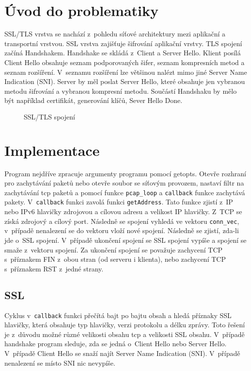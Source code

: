 \documentclass[a4paper, 12pt, titlepage]{article}
\begin{document}

\tableofcontents
\newpage

\section{Úvod do problematiky}
SSL/TLS vrstva se nachází z~pohledu síťové architektury mezi aplikační a transportní vrstvou. SSL vrstva zajišťuje šifrování aplikační vrstvy. TLS spojení začíná Handshakem. Handshake se skládá z~Client a Server Hello. Klient posílá Client Hello obsahuje seznam podporovaných šifer, seznam kompresních metod a seznam rozšíření. V~seznamu rozšíření lze většinou nalézt mimo jiné Server Name Indication (SNI). Server by měl poslat Server Hello, které obsahuje jen vybranou metodu šifrování a vybranou kompresní metodu. Součástí Handshaku by mělo být například certifikát, generování klíčů, Sever Hello Done. 

\begin{figure}[H]
    \centering
    \caption{SSL/TLS spojení\cite{obr1}}
    \label{obrazek 1}
\end{figure}

\section{Implementace}
Program nejdříve zpracuje argumenty programu pomocí getopts\cite{getopt}. Otevře rozhraní pro zachytávání paketů nebo otevře soubor se síťovým provozem, nastaví filtr na zachytávání tcp paketů a pomocí funkce \verb|pcap_loop| a \verb|callback| funkce\cite{pcap} zachytává pakety. V~\verb|callback| funkci zavolá funkci \verb|getAddress|. Tato funkce zjistí z~IP nebo IPv6 hlavičky zdrojovou a cílovou adresu a velikost IP hlavičky. Z~TCP se získá zdrojový a cílový port. Následně se spojení vyhledá ve vektoru \verb|conn_vec|, v~případě nenalezení se do vektoru vloží nové spojení. Následně se zjistí, zda-li jde o~SSL spojení. V~případě ukončení spojení se SSL spojení vypíše a spojení se smaže z~vektoru spojení. Za ukončení spojení se považuje zachycení TCP s~příznakem FIN z~obou stran (od serveru i klienta), nebo zachycení TCP s~příznakem RST z~jedné strany.


\subsection{SSL}
Cyklus v~\verb|callback| funkci přečítá bajt po bajtu obsah a hledá příznaky SSL hlavičky, která obsahuje typ hlavičky, verzi protokolu a délku zprávy. Toto řešení je z~důvodu možné různé velikosti obsahu tcp a velikosti SSL obsahu. V~případě handshake program sleduje, zda se jedná o~Client Hello nebo Server Hello. V~případě Client Hello se snaží najít Server Name Indication (SNI). V~případě nenalezení se místo SNI nic nevypíše.
\end{document}
